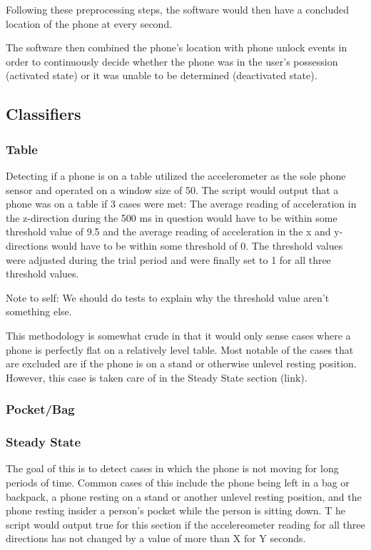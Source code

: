 \documentclass{article}
\begin{document}
Following these preprocessing steps, the software would then have a concluded location of the phone at every second.

The software then combined the phone's location with phone unlock events in order to continuously decide whether the phone was in
the user's possession (activated state) or it was unable to be determined (deactivated state).


\subsection{Classifiers}
\subsubsection{Table}
\indent Detecting if a phone is on a table utilized the accelerometer as the sole phone sensor and operated on a window size of 50. 
The script would output that a phone was on a table if 3 cases were met: 
The average reading of acceleration in the z-direction during the 500 ms in question would have to be within some threshold value of 9.5 and the average reading of acceleration in the x and y-directions would have to be within some threshold of 0.  
The threshold values were adjusted during the trial period and were finally set to 1 for all three threshold values. 

Note to self: We should do tests to explain why the threshold value aren't something else. 

\indent This methodology is somewhat crude in that it would only sense cases where a phone is perfectly flat on a relatively level table. 
Most notable of the cases that are excluded are if the phone is on a stand or otherwise unlevel resting position. 
However, this case is taken care of in the Steady State section (link).
\subsubsection{Pocket/Bag}

\subsubsection{Steady State}
\indent The goal of this is to detect cases in which the phone is not moving for long periods of time. 
Common cases of this include the phone being left in a bag or backpack, a phone resting on a stand or another unlevel resting position, and the phone resting insider a person's pocket while the person is sitting down. T
he script would output true for this section if the accelereometer reading for all three directions has not changed by a value of more than X for Y seconds.
\end{document}
